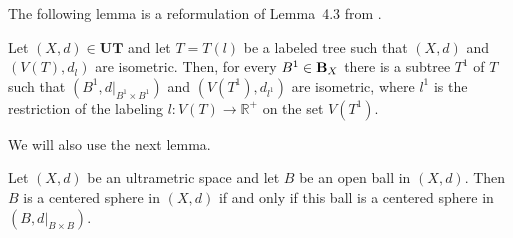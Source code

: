 \documentclass{article}
\begin{document}
The following lemma is a reformulation of Lemma~4.3 from \cite{DK2024DLPSSAG}.


\begin{Lemma}\label{scgkk}
Let $(X,d)\in \mathbf{UT}$ and let $T=T(l)$ be a labeled tree such that $(X,d)$ and $(V(T),d_l)$ are isometric.
Then, for every $B^{1}\in {\bf B}_{X}$ there is a subtree $T^{1}$ of $T$ such that $
(B^{1},d\big|_{B^{1}\times B^{1}})$
and
$(V(T^1), d_{l^{1}})$ are isometric,
 where $l^{1}$ is the restriction of the labeling
$l : V(T) \to \mathbb{R}^{+}$ on the set $V(T^{1})$.
\end{Lemma}


We will also use the next lemma.
\begin{Lemma}\label{dhiu}
     Let $(X,d)$ be an ultrametric space and let $B$ be an open ball in $(X,d)$. Then $B$ is a centered sphere in $(X,d)$ if and only if this ball is a centered sphere in $(B, d|_{B\times B})$.
\end{Lemma}
\end{document}
